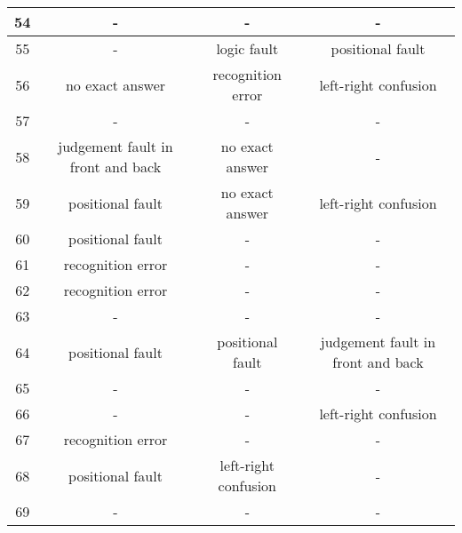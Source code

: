 \begin{table*}[ht]
{\begin{tabular}{|c|c|c|c|}
        54              & -                                 & -                    & -                                 \\ \hline
        55              & -                                 & logic fault           & positional fault                 \\ \hline
        56              & no exact answer                   & recognition error    & left-right confusion              \\ \hline
        57              & -                                 & -                    & -                                 \\ \hline
        58              & judgement fault in front and back & no exact answer      & -                                 \\ \hline
        59              & positional fault                  & no exact answer      & left-right confusion              \\ \hline
        60              & positional fault                  & -                    & -                                 \\ \hline
        61              & recognition error                 & -                    & -                                 \\ \hline
        62              & recognition error                 & -                    & -                                 \\ \hline
        63              & -                                 & -                    & -                                 \\ \hline
        64              & positional fault                  & positional fault    & judgement fault in front and back \\ \hline
        65              & -                                 & -                    & -                                 \\ \hline
        66              & -                                 & -                    & left-right confusion              \\ \hline
        67              & recognition error                 & -                    & -                                 \\ \hline
        68              & positional fault                  & left-right confusion & -                                 \\ \hline
        69              & -                                 & -                    & -                                 \\ \hline

\end{tabular}}
\end{table*}
